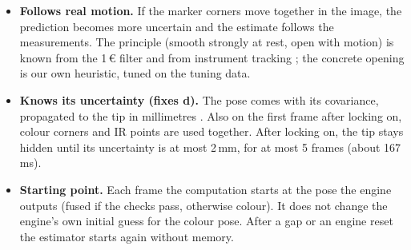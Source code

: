 \documentclass[11pt,a4paper,fleqn]{article}
\begin{document}
\begin{itemize}
        its weight (Huber weighting, iteratively reweighted least squares \cite[§9.4]{zhang1997parameter}). The
        6-mm distance check no longer decides whether IR points are used, so exactly the frames that fail it today
        keep their IR points. IR points of a frame are only left out if there are fewer than 6, or if they fit the
        model grossly badly (residual above 6\,mm; same quantity as today's 2.5-mm check, not a distance check).
  \item \textbf{Follows real motion.} If the marker corners move together in the image, the prediction becomes more
        uncertain and the estimate follows the measurements. The principle (smooth strongly at rest, open with
        motion) is known from the 1\,€ filter \cite{casiez2012oneeuro} and from instrument tracking
        \cite[pp.~279--280]{cai2024distributed}; the concrete opening is our own heuristic, tuned on the tuning data.
  \item \textbf{Knows its uncertainty (fixes d).} The pose comes with its covariance, propagated to the tip in
        millimetres \cite[Eq.~55]{sola2018micro}. Also on the first frame after locking on, colour corners and IR
        points are used together. After locking on, the tip stays hidden until its uncertainty is at most 2\,mm,
        for at most 5 frames (about 167\,ms).
  \item \textbf{Starting point.} Each frame the computation starts at the pose the engine outputs (fused if the
        checks pass, otherwise colour). It does not change the engine's own initial guess for the colour pose.
        After a gap or an engine reset the estimator starts again without memory.
\end{itemize}
\end{document}
